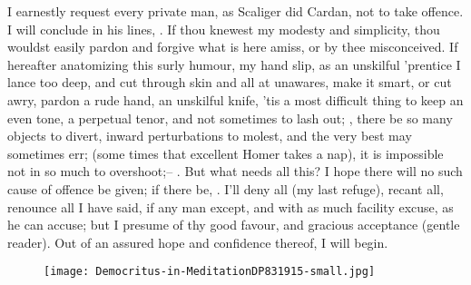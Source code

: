 I earnestly request every private man, as Scaliger did Cardan, not to take
offence. I will conclude in his lines, . If thou
knewest my modesty and simplicity, thou wouldst easily
pardon and forgive what is here amiss, or by thee misconceived. If hereafter
anatomizing this surly humour, my hand slip, as an unskilful 'prentice I lance
too deep, and cut through skin and all at unawares, make it smart, or cut awry,
pardon a rude hand, an unskilful knife, 'tis a most
difficult thing to keep an even tone, a perpetual tenor, and not sometimes to
lash out; , there be so many objects to
divert, inward perturbations to molest, and the very best may sometimes err;
 (some times that excellent Homer takes a
nap), it is impossible not in so much to overshoot;-- . But what needs all this? I hope there will no such cause
of offence be given; if there be, . I'll deny all (my last
refuge), recant all, renounce all I have said, if any man except, and with as
much facility excuse, as he can accuse; but I presume of thy good favour, and
gracious acceptance (gentle reader). Out of an assured hope and confidence
thereof, I will begin.

\begin{figure}[p]
  \begingroup
  \centering
  \texttt{[image: Democritus-in-MeditationDP831915-small.jpg]}
  \label{fig:democritusinmeditation}
\end{figure}
\clearpage{}
